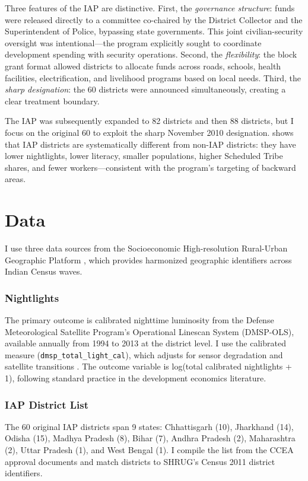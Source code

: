 \documentclass[12pt]{article}
\begin{document}
Three features of the IAP are distinctive. First, the \textit{governance structure}: funds were released directly to a committee co-chaired by the District Collector and the Superintendent of Police, bypassing state governments. This joint civilian-security oversight was intentional---the program explicitly sought to coordinate development spending with security operations. Second, the \textit{flexibility}: the block grant format allowed districts to allocate funds across roads, schools, health facilities, electrification, and livelihood programs based on local needs. Third, the \textit{sharp designation}: the 60 districts were announced simultaneously, creating a clear treatment boundary.

The IAP was subsequently expanded to 82 districts and then 88 districts, but I focus on the original 60 to exploit the sharp November 2010 designation.  shows that IAP districts are systematically different from non-IAP districts: they have lower nightlights, lower literacy, smaller populations, higher Scheduled Tribe shares, and fewer workers---consistent with the program's targeting of backward areas.

\section{Data}

I use three data sources from the Socioeconomic High-resolution Rural-Urban Geographic Platform \citep[SHRUG v2.1,][]{asher2021}, which provides harmonized geographic identifiers across Indian Census waves.

\subsubsection*{Nightlights} The primary outcome is calibrated nighttime luminosity from the Defense Meteorological Satellite Program's Operational Linescan System (DMSP-OLS), available annually from 1994 to 2013 at the district level. I use the calibrated measure (\texttt{dmsp\_total\_light\_cal}), which adjusts for sensor degradation and satellite transitions \citep{henderson2012}. The outcome variable is log(total calibrated nightlights + 1), following standard practice in the development economics literature.

\subsubsection*{IAP District List} The 60 original IAP districts span 9 states: Chhattisgarh (10), Jharkhand (14), Odisha (15), Madhya Pradesh (8), Bihar (7), Andhra Pradesh (2), Maharashtra (2), Uttar Pradesh (1), and West Bengal (1). I compile the list from the CCEA approval documents and match districts to SHRUG's Census 2011 district identifiers.
\end{document}
